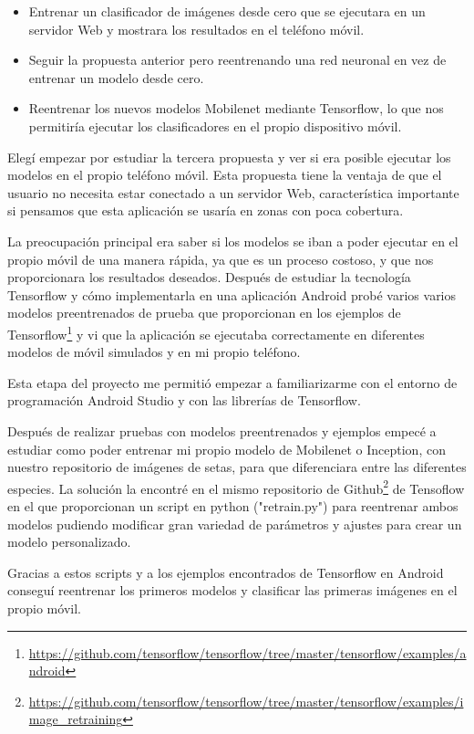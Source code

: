 \begin{itemize}
	\item Entrenar un clasificador de imágenes desde cero que se ejecutara en un servidor Web y mostrara los resultados en el teléfono móvil.
	\item Seguir la propuesta anterior pero reentrenando una red neuronal en vez de entrenar un modelo desde cero.
	\item Reentrenar los nuevos modelos Mobilenet mediante Tensorflow, lo que nos permitiría ejecutar los clasificadores en el propio dispositivo móvil.
\end{itemize}

Elegí empezar por estudiar la tercera propuesta y ver si era posible ejecutar los modelos en el propio teléfono móvil. Esta propuesta tiene la ventaja de que el usuario no necesita estar conectado a un servidor Web, característica importante si pensamos que esta aplicación se usaría en zonas con poca cobertura.

La preocupación principal era saber si los modelos se iban a poder ejecutar en el propio móvil de una manera rápida, ya que es un proceso costoso, y que nos proporcionara los resultados deseados. Después de estudiar la tecnología Tensorflow y cómo implementarla en una aplicación Android probé varios varios modelos preentrenados de prueba que proporcionan en los ejemplos de Tensorflow\footnote{\url{https://github.com/tensorflow/tensorflow/tree/master/tensorflow/examples/android}} y vi que la aplicación se ejecutaba correctamente en diferentes modelos de móvil simulados y en mi propio teléfono.

Esta etapa del proyecto me permitió empezar a familiarizarme con el entorno de programación Android Studio y con las librerías de Tensorflow.

Después de realizar pruebas con modelos preentrenados y ejemplos empecé a estudiar como poder entrenar mi propio modelo de Mobilenet o Inception, con nuestro repositorio de imágenes de setas, para que diferenciara entre las diferentes especies. La solución la encontré en el mismo repositorio de Github\footnote{\url{https://github.com/tensorflow/tensorflow/tree/master/tensorflow/examples/image_retraining}} de Tensoflow en el que proporcionan un script en python ("retrain.py") para reentrenar ambos modelos pudiendo modificar gran variedad de parámetros y ajustes para crear un modelo personalizado.

Gracias a estos scripts y a los ejemplos encontrados de Tensorflow en Android conseguí reentrenar los primeros modelos y clasificar las primeras imágenes en el propio móvil.

